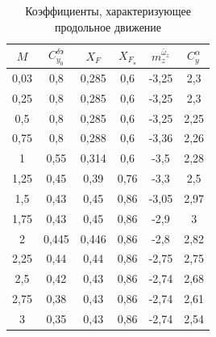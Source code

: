 \begin{table}[H]
    \centering
    \caption{Коэффициенты, характеризующее продольное движение}
    \label{tab:Коэффициенты, характеризующее продольное движение}
    \begin{tabular}{|c||c|c|c|c|c|}
    \hline
        $M$ & $C_{y_0}^{\delta \text{э}}$ &$X_F$ & $X_{F_{\text{э}}}$ &$m_z^{\bar{\omega}_z}$ & $C_y^{\alpha}$ \\ \hline \hline
        0,03  & 0,8  & 0,285  & 0,6  & -3,25 & 2,3 \\ \hline
        0,25  & 0,8  & 0,285  & 0,6  & -3,25 &2,3 \\ \hline
        0,5  & 0,8  & 0,285  & 0,6  & -3,25 & 2,25\\ \hline
        0,75  & 0,8  & 0,288  & 0,6  & -3,36 & 2,26\\ \hline
        1  & 0,55  & 0,314  & 0,6  & -3,5 &2,28 \\ \hline
        1,25  & 0,45  & 0,39  & 0,76  & -3,3 &2,5 \\ \hline
        1,5  & 0,43  & 0,45  & 0,86  & -3,05 &2,97 \\ \hline
        1,75  & 0,43  & 0,45  & 0,86  & -2,9 & 3\\ \hline
        2  & 0,445  & 0,446  & 0,86  & -2,8 & 2,82\\ \hline
        2,25  & 0,44  & 0,44  & 0,86  & -2,75 & 2,75\\ \hline
        2,5  & 0,42  & 0,43  & 0,86  & -2,74 & 2,68\\ \hline
        2,75  & 0,38  & 0,43  & 0,86  & -2,74 & 2,61\\ \hline
        3  & 0,35  & 0,43  & 0,86  & -2,74 & 2,54\\ \hline
    \end{tabular}
\end{table}

